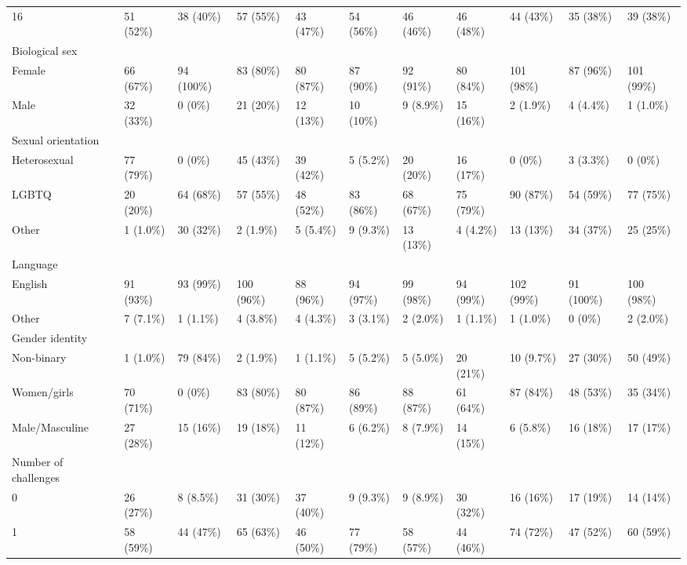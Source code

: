 \begin{table}[ht]
\begin{tabular}{lllllllllll}
  16 & 51 (52\%) & 38 (40\%) & 57 (55\%) & 43 (47\%) & 54 (56\%) & 46 (46\%) & 46 (48\%) & 44 (43\%) & 35 (38\%) & 39 (38\%) \\ 
  Biological sex &  &  &  &  &  &  &  &  &  &  \\ 
  Female & 66 (67\%) & 94 (100\%) & 83 (80\%) & 80 (87\%) & 87 (90\%) & 92 (91\%) & 80 (84\%) & 101 (98\%) & 87 (96\%) & 101 (99\%) \\ 
  Male & 32 (33\%) & 0 (0\%) & 21 (20\%) & 12 (13\%) & 10 (10\%) & 9 (8.9\%) & 15 (16\%) & 2 (1.9\%) & 4 (4.4\%) & 1 (1.0\%) \\ 
  Sexual orientation &  &  &  &  &  &  &  &  &  &  \\ 
  Heterosexual & 77 (79\%) & 0 (0\%) & 45 (43\%) & 39 (42\%) & 5 (5.2\%) & 20 (20\%) & 16 (17\%) & 0 (0\%) & 3 (3.3\%) & 0 (0\%) \\ 
  LGBTQ & 20 (20\%) & 64 (68\%) & 57 (55\%) & 48 (52\%) & 83 (86\%) & 68 (67\%) & 75 (79\%) & 90 (87\%) & 54 (59\%) & 77 (75\%) \\ 
  Other & 1 (1.0\%) & 30 (32\%) & 2 (1.9\%) & 5 (5.4\%) & 9 (9.3\%) & 13 (13\%) & 4 (4.2\%) & 13 (13\%) & 34 (37\%) & 25 (25\%) \\ 
  Language &  &  &  &  &  &  &  &  &  &  \\ 
  English & 91 (93\%) & 93 (99\%) & 100 (96\%) & 88 (96\%) & 94 (97\%) & 99 (98\%) & 94 (99\%) & 102 (99\%) & 91 (100\%) & 100 (98\%) \\ 
  Other & 7 (7.1\%) & 1 (1.1\%) & 4 (3.8\%) & 4 (4.3\%) & 3 (3.1\%) & 2 (2.0\%) & 1 (1.1\%) & 1 (1.0\%) & 0 (0\%) & 2 (2.0\%) \\ 
  Gender identity &  &  &  &  &  &  &  &  &  &  \\ 
  Non-binary & 1 (1.0\%) & 79 (84\%) & 2 (1.9\%) & 1 (1.1\%) & 5 (5.2\%) & 5 (5.0\%) & 20 (21\%) & 10 (9.7\%) & 27 (30\%) & 50 (49\%) \\ 
  Women/girls & 70 (71\%) & 0 (0\%) & 83 (80\%) & 80 (87\%) & 86 (89\%) & 88 (87\%) & 61 (64\%) & 87 (84\%) & 48 (53\%) & 35 (34\%) \\ 
  Male/Masculine & 27 (28\%) & 15 (16\%) & 19 (18\%) & 11 (12\%) & 6 (6.2\%) & 8 (7.9\%) & 14 (15\%) & 6 (5.8\%) & 16 (18\%) & 17 (17\%) \\ 
  Number of challenges &  &  &  &  &  &  &  &  &  &  \\ 
  0 & 26 (27\%) & 8 (8.5\%) & 31 (30\%) & 37 (40\%) & 9 (9.3\%) & 9 (8.9\%) & 30 (32\%) & 16 (16\%) & 17 (19\%) & 14 (14\%) \\ 
  1 & 58 (59\%) & 44 (47\%) & 65 (63\%) & 46 (50\%) & 77 (79\%) & 58 (57\%) & 44 (46\%) & 74 (72\%) & 47 (52\%) & 60 (59\%) \\ 

\end{tabular}
\end{table}
